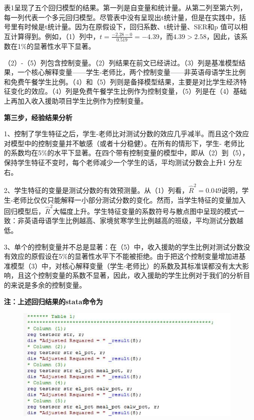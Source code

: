 \documentclass[cn,12pt,math=newtx,citestyle=gb7714-2015,bibstyle=gb7714-2015]{elegantbook}
\begin{document}
	表1呈现了五个回归模型的结果。第一列是自变量和统计量。从第二列至第六列，每一列代表一个多元回归模型。尽管表中没有呈现出t统计量，但是在实践中，括号里有时候是t统计量。因为在原假设下，回归系数、t统计量、SER和p 值可以相互计算得到。例如，（1）列中，$t=\frac{-2.28-0}{0.519}=-4.39$，而$4.39>2.58$，因此，该系数在1\%的显著性水平下显著。
	
	（2）-（5）列包含控制变量。（2）列结果在前文已经讲过。（3）列是基准模型结果，一个核心解释变量——学生-老师比，两个控制变量——非英语母语学生比例和免费午餐学生比例。（4）和（5）列则是备择模型结果，主要是对比学生经济特征变化的效应。（4）列是免费午餐学生比例作为控制变量，（5）列是在（4）基础上再加入收入援助项目学生比例作为控制变量。
	
	\textbf{第三步，经验结果分析}
	
	1、控制了学生特征之后，学生-老师比对测试分数的效应几乎减半。而且这个效应对模型中的控制变量并不敏感（或者十分稳健）。在所有的情形下，学生- 老师比的系数均在5\%的水平下显著。在四个带有控制变量的模型中，即从（2）到（5），保持学生特征不变时，每个老师减少一个学生的话，平均测试分数会上升1 分左右。
	
	2、学生特征的变量是测试分数的有效预测量。从（1）列看，$\hat{R}^2=0.049$说明，学生-老师比仅仅只能解释一小部分测试分数的变化。然而，当学生特征的变量加入回归模型后，$\hat{R}^2$大幅度上升。学生特征变量的系数符号与散点图中呈现的模式一致：非英语母语学生比例越高、家境贫寒学生比例越高的班级，平均测试分数越低。
	
	3、单个的控制变量并不总是显著：在（5）中，收入援助的学生比例对测试分数没有效应的原假设在5\%的显著性水平下不能被拒绝。由于把这个控制变量增加进基准模型（3）中，对核心解释变量（学生-老师比）的系数及其标准误都没有太大影响，且这个控制变量的系数不显著，因此，收入援助的学生比例对于我们的分析目的来说是多余的控制变量。
	
	\textbf{注：上述回归结果的stata命令为}
	\begin{figure}[htbp]
		\centering
		\includegraphics[width=1\textwidth]{cmd.jpg}
	\end{figure}
\end{document}

